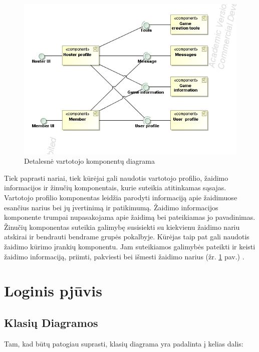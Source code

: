 \documentclass{VUMIFPSkursinis}
\begin{document}
		\begin{figure}[H]
			\centering
			\includegraphics[scale=0.6]{img/UMLComponent3}
			\caption{Detalesnė vartotojo komponentų diagrama}
			\label{img:UMLComponent3}
		\end{figure}
		Tiek paprasti nariai, tiek kūrėjai gali naudotis vartotojo profilio, žaidimo informacijos ir žinučių komponentais, kurie suteikia atitinkamas sąsajas. Vartotojo profilio komponentas leidžia parodyti informaciją apie žaidimuose esančius narius bei jų įvertinimą ir patikimumą. Žaidimo informacijos komponente trumpai nupasakojama apie žaidimą bei pateikiamas jo pavadinimas. Žinučių komponentas suteikia galimybę susisiekti su kiekvienu žaidimo nariu atskirai ir bendrauti bendrame grupės pokalbyje. Kūrėjas taip pat gali naudotis žaidimo kūrimo įrankių komponentu. Jam suteikiamos galimybės pateikti ir keisti žaidimo informaciją, priimti, pakviesti bei išmesti žaidimo narius (žr. \ref{img:UMLComponent3} pav.) .

			
\section{Loginis pjūvis}
	\subsection{Klasių Diagramos}
			Tam, kad būtų patogiau suprasti, klasių diagrama yra padalinta į kelias dalis:
\end{document}
